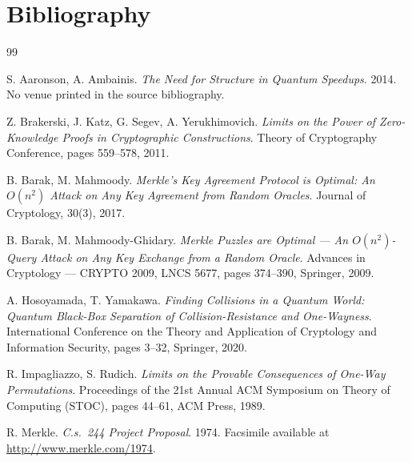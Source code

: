\documentclass{aicr-conjecture}
\begin{document}
\section{Bibliography}

\begin{aicrbibliography}{99}

S. Aaronson, A. Ambainis.
\emph{The Need for Structure in Quantum Speedups}.
2014. No venue printed in the source bibliography.

Z. Brakerski, J. Katz, G. Segev, A. Yerukhimovich.
\emph{Limits on the Power of Zero-Knowledge Proofs in Cryptographic
Constructions}.
Theory of Cryptography Conference, pages 559--578, 2011.

B. Barak, M. Mahmoody.
\emph{Merkle's Key Agreement Protocol is Optimal: An $O(n^2)$ Attack on
Any Key Agreement from Random Oracles}.
Journal of Cryptology, 30(3), 2017.

B. Barak, M. Mahmoody-Ghidary.
\emph{Merkle Puzzles are Optimal --- An $O(n^2)$-Query Attack on Any Key
Exchange from a Random Oracle}.
Advances in Cryptology --- CRYPTO 2009, LNCS 5677, pages 374--390,
Springer, 2009.

A. Hosoyamada, T. Yamakawa.
\emph{Finding Collisions in a Quantum World: Quantum Black-Box
Separation of Collision-Resistance and One-Wayness}.
International Conference on the Theory and Application of Cryptology and
Information Security, pages 3--32, Springer, 2020.

R. Impagliazzo, S. Rudich.
\emph{Limits on the Provable Consequences of One-Way Permutations}.
Proceedings of the 21st Annual ACM Symposium on Theory of Computing
(STOC), pages 44--61, ACM Press, 1989.

R. Merkle.
\emph{C.s.\ 244 Project Proposal}.
1974. Facsimile available at \url{http://www.merkle.com/1974}.

\end{aicrbibliography}
\end{document}
